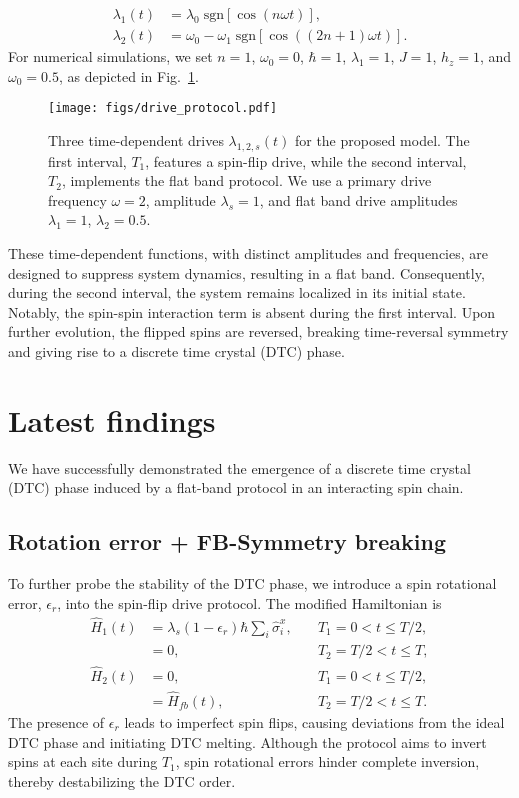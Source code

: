 \documentclass[a4paper,10pt]{article}
\begin{document}
{\begin{align}
    \lambda_1(t) &= \lambda_0 \;\mathrm{sgn}[\cos(n\omega t)],\\
    \lambda_2(t) &= \omega_0 - \omega_1 \;\mathrm{sgn}[\cos((2n+1)\omega t)].
\end{align}
For numerical simulations, we set $n=1$, $\omega_0 = 0$, $\hbar = 1$, $\lambda_1 = 1$, $J = 1$, $h_z = 1$, and $\omega_0 = 0.5$, as depicted in Fig.~\ref{fig:flatband_drive_protocol}.
\begin{figure}[h]
    \centering
    \texttt{[image: figs/drive\_protocol.pdf]}
    \caption{Three time-dependent drives $\lambda_{1,2,s}(t)$ for the proposed model. The first interval, $T_1$, features a spin-flip drive, while the second interval, $T_2$, implements the flat band protocol. We use a primary drive frequency $\omega = 2$, amplitude $\lambda_s = 1$, and flat band drive amplitudes $\lambda_1 = 1$, $\lambda_2 = 0.5$.}
   \label{fig:flatband_drive_protocol}
\end{figure}
These time-dependent functions, with distinct amplitudes and frequencies, are designed to suppress system dynamics, resulting in a flat band. Consequently, during the second interval, the system remains localized in its initial state. Notably, the spin-spin interaction term is absent during the first interval. Upon further evolution, the flipped spins are reversed, breaking time-reversal symmetry and giving rise to a discrete time crystal (DTC) phase.}

\newpage
\section{Latest findings}
We have successfully demonstrated the emergence of a discrete time crystal (DTC) phase induced by a flat-band protocol in an interacting spin chain.

\subsection{Rotation error + FB-Symmetry breaking}
 To further probe the stability of the DTC phase, we introduce a spin rotational error, $\epsilon_r$, into the spin-flip drive protocol. The modified Hamiltonian is
\begin{align}
    \hat{H}_1(t) &= \lambda_s (1-\epsilon_r) \hbar \sum_i \hat{\sigma}^x_i, &\quad T_1 = 0<t \le T/2, \\
            &= 0, &\quad T_2 = T/2<t \le T, \\
    \hat{H}_2(t) &= 0, &\quad T_1 = 0<t \le T/2, \\
     &= \hat{H}_{fb}(t), &\quad T_2  = T/2<t \le T.
\end{align}
The presence of $\epsilon_r$ leads to imperfect spin flips, causing deviations from the ideal DTC phase and initiating DTC melting. Although the protocol aims to invert spins at each site during $T_1$, spin rotational errors hinder complete inversion, thereby destabilizing the DTC order.
\end{document}

